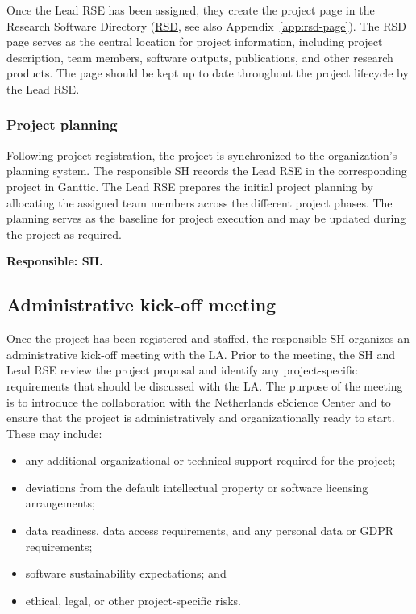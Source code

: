 Once the Lead RSE has been assigned, they create the project page in the Research Software Directory 
(\href{https://research-software-directory.org/}{RSD}, see also Appendix~\ref{app:rsd-page}). The RSD page serves as the 
central location for project information, including project description, team members, software outputs, publications, 
and other research products. The page should be kept up to date throughout the project lifecycle by the Lead RSE.

\subsubsection{Project planning}
Following project registration, the project is synchronized to the organization’s planning system. The responsible SH 
records the Lead RSE in the corresponding project in Ganttic. The Lead RSE prepares the initial project planning by 
allocating the assigned team members across the different project phases. The planning serves as the baseline for 
project execution and may be updated during the project as required.

\textbf{Responsible: SH.}

\subsection{Administrative kick-off meeting}
\label{sec:init:admin-kickoff}
Once the project has been registered and staffed, the responsible SH organizes an administrative kick-off meeting with 
the LA. Prior to the meeting, the SH and Lead RSE review the project proposal and identify any project-specific 
requirements that should be discussed with the LA. The purpose of the meeting is to introduce the collaboration with 
the Netherlands eScience Center and to ensure that the project is administratively and organizationally ready to start. 
These may include:
\vspace{-0.2cm}
\begin{itemize}
\item any additional organizational or technical support required for the project;
\item deviations from the default intellectual property or software licensing arrangements;
\item data readiness, data access requirements, and any personal data or GDPR requirements;
\item software sustainability expectations; and
\item ethical, legal, or other project-specific risks.
\end{itemize}
\vspace{-0.2cm}

